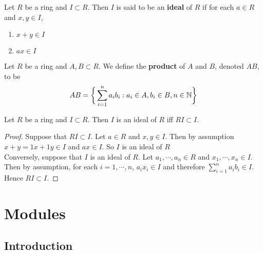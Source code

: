 \documentclass{book}
\begin{document}
	\begin{defn}
	Let $R$ be a ring and $I \subset R$. Then $I$ is said 
	to be an \textbf{ideal} of $R$ if for each $a \in R$ and $x,y \in I$,
	\begin{enumerate}
	\item  $x + y \in I$
	\item  $ax \in I$
	\end{enumerate}
	\end{defn}
	
	\begin{defn}
	Let $R$ be a ring and $A,B \subset R$. We define the \textbf{product} of $A$ and $B$, denoted $AB$, to be $$AB = \bigg \{\sum_{i=1}^n a_ib_i: a_i \in A, b_i \in B, n \in \mathbb{N} \bigg \}$$
	\end{defn}	
	
	\begin{ex}
	Let $R$ be a ring and $I \subset R$. Then $I$ is an ideal of $R$ iff $RI \subset I$. 
	\end{ex}
	
	\begin{proof}
	Suppose that $RI \subset I$. Let $a \in R$ and $x,y \in I$. Then by assumption $x + y = 1x + 1y \in I$ and $ax \in I$. So $I$ is an ideal of $R$\\
	Conversely, suppose that $I$ is an ideal of $R$. Let $a_1, \cdots, a_n \in R$ and $x_1, \cdots, x_n \in I$. Then by assumption, for each $i = 1, \cdots, n$, $a_ix_i \in I$ and therefore $\sum\limits_{i=1}^n a_ib_i \in I$. Hence $RI \subset I$.
	\end{proof}
	
	
	
	
	
	
	
	
	
	
	
	
	
	
	
	
	
	
	
	
	
	
	
	\newpage	
	\section{Modules}
	
	\subsection{Introduction}
	
\end{document}
